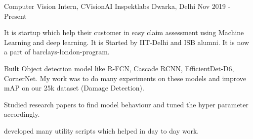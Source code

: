 

\begin{cventries}

  \cventry
    {Computer Vision Intern, CVisionAI} %
    {Inspektlabs} %
    {Dwarka, Delhi} %
    {Nov 2019 - Present} %
    {
      \begin{cvitems} %
        \item {It is startup which help their customer in easy claim assessment using Machine Learning and deep learning. It is Started by IIT-Delhi and ISB alumni. It is now a part of barclays-london-program. }
        \item {Built Object detection model like R-FCN, Cascade RCNN, EfficientDet-D6, CornerNet. My work was to do many experiments on these models and improve mAP on our 25k dataset (Damage Detection).}
        \item {Studied research papers to find model behaviour and tuned the hyper parameter accordingly.}
         \item {developed many utility scripts which helped in day to day work.}
      \end{cvitems}
    }


\end{cventries}
